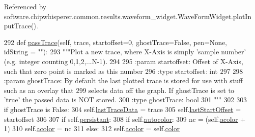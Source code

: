 Referenced by software.\+chipwhisperer.\+common.\+results.\+waveform\+\_\+widget.\+Wave\+Form\+Widget.\+plot\+Input\+Trace().


\begin{DoxyCode}
292     \textcolor{keyword}{def }\hyperlink{classsoftware_1_1chipwhisperer_1_1common_1_1ui_1_1GraphWidget_1_1GraphWidget_ac61521bf48435fc88162be713ec61b41}{passTrace}(self, trace, startoffset=0, ghostTrace=False, pen=None, idString = ""):
293         \textcolor{stringliteral}{"""Plot a new trace, where X-Axis is simply 'sample number' (e.g. integer counting 0,1,2,...N-1).}
294 \textcolor{stringliteral}{        }
295 \textcolor{stringliteral}{        :param startoffset: Offset of X-Axis, such that zero point is marked as this number}
296 \textcolor{stringliteral}{        :type startoffset: int}
297 \textcolor{stringliteral}{        }
298 \textcolor{stringliteral}{        :param ghostTrace: By default the last plotted trace is stored for use with stuff such as an
       overlay that}
299 \textcolor{stringliteral}{                           selects data off the graph. If ghostTrace is set to 'true' the passed data is
       NOT stored.}
300 \textcolor{stringliteral}{        :type ghostTrace: bool}
301 \textcolor{stringliteral}{        """}
302 
303         \textcolor{keywordflow}{if} ghostTrace \textcolor{keywordflow}{is} \textcolor{keyword}{False}:
304             self.\hyperlink{classsoftware_1_1chipwhisperer_1_1common_1_1ui_1_1GraphWidget_1_1GraphWidget_a9477e6c69fcb4f3b3b6f973f35e6946c}{lastTraceData} = trace
305             self.\hyperlink{classsoftware_1_1chipwhisperer_1_1common_1_1ui_1_1GraphWidget_1_1GraphWidget_a4fbf18ac7163042daf94edd06f5370ed}{lastStartOffset} = startoffset
306 
307         \textcolor{keywordflow}{if} self.\hyperlink{classsoftware_1_1chipwhisperer_1_1common_1_1ui_1_1GraphWidget_1_1GraphWidget_a9832e2c8321ff1747bfcc42ebe97813b}{persistant}:
308             \textcolor{keywordflow}{if} self.\hyperlink{classsoftware_1_1chipwhisperer_1_1common_1_1ui_1_1GraphWidget_1_1GraphWidget_af3963871459dec56796ecd62253e9c9b}{autocolor}:
309                 nc = (self.\hyperlink{classsoftware_1_1chipwhisperer_1_1common_1_1ui_1_1GraphWidget_1_1GraphWidget_a961b46cf3956b4c17dca9cc06d3fd086}{acolor} + 1) %
310                 self.\hyperlink{classsoftware_1_1chipwhisperer_1_1common_1_1ui_1_1GraphWidget_1_1GraphWidget_a961b46cf3956b4c17dca9cc06d3fd086}{acolor} = nc
311             \textcolor{keywordflow}{else}:
312                 self.\hyperlink{classsoftware_1_1chipwhisperer_1_1common_1_1ui_1_1GraphWidget_1_1GraphWidget_a961b46cf3956b4c17dca9cc06d3fd086}{acolor} = self.\hyperlink{classsoftware_1_1chipwhisperer_1_1common_1_1ui_1_1GraphWidget_1_1GraphWidget_af32d32435cc44318cd58a286fe2f0a46}{color}

\end{DoxyCode}
